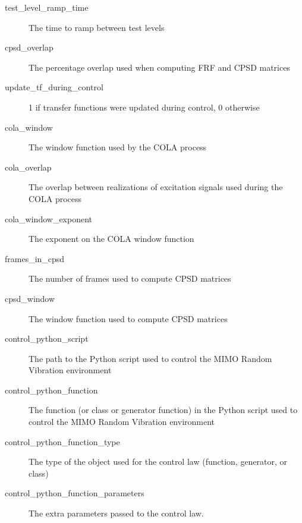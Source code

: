\documentclass[pdf,12pt,report]{SANDreport}
\begin{document}
\begin{description}
        \item[test\_level\_ramp\_time] The time to ramp between test levels
        \item[cpsd\_overlap] The percentage overlap used when computing \ac{FRF} and \ac{CPSD} matrices
        \item[update\_tf\_during\_control] 1 if transfer functions were updated during control, 0 otherwise
        \item[cola\_window] The window function used by the \ac{COLA} process
        \item[cola\_overlap] The overlap between realizations of excitation signals used during the \ac{COLA} process
        \item[cola\_window\_exponent] The exponent on the \ac{COLA} window function
        \item[frames\_in\_cpsd] The number of frames used to compute \ac{CPSD} matrices
        \item[cpsd\_window] The window function used to compute \ac{CPSD} matrices
        \item[control\_python\_script] The path to the Python script used to control the \Ac{MIMO} Random Vibration environment
        \item[control\_python\_function] The function (or class or generator function) in the Python script used to control the \Ac{MIMO} Random Vibration environment
        \item[control\_python\_function\_type] The type of the object used for the control law (function, generator, or class)
        \item[control\_python\_function\_parameters] The extra parameters passed to the control law.
    \end{description}
    
\end{document}
